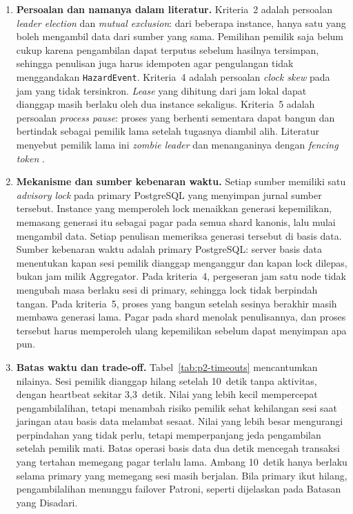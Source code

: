 \begin{enumerate}
\item \textbf{Persoalan dan namanya dalam literatur.} Kriteria~2 adalah persoalan \emph{leader election} dan \emph{mutual exclusion}: dari beberapa instance, hanya satu yang boleh mengambil data dari sumber yang sama. Pemilihan pemilik saja belum cukup karena pengambilan dapat terputus sebelum hasilnya tersimpan, sehingga penulisan juga harus idempoten agar pengulangan tidak menggandakan \texttt{HazardEvent}. Kriteria~4 adalah persoalan \emph{clock skew} pada jam yang tidak tersinkron. \emph{Lease} yang dihitung dari jam lokal dapat dianggap masih berlaku oleh dua instance sekaligus. Kriteria~5 adalah persoalan \emph{process pause}: proses yang berhenti sementara dapat bangun dan bertindak sebagai pemilik lama setelah tugasnya diambil alih. Literatur menyebut pemilik lama ini \emph{zombie leader} dan menanganinya dengan \emph{fencing token} \cite{kleppmann2017}.

\item \textbf{Mekanisme dan sumber kebenaran waktu.} Setiap sumber memiliki satu \emph{advisory lock} pada primary PostgreSQL yang menyimpan jurnal sumber tersebut. Instance yang memperoleh lock menaikkan generasi kepemilikan, memasang generasi itu sebagai pagar pada semua shard kanonis, lalu mulai mengambil data. Setiap penulisan memeriksa generasi tersebut di basis data. Sumber kebenaran waktu adalah primary PostgreSQL: server basis data menentukan kapan sesi pemilik dianggap menganggur dan kapan lock dilepas, bukan jam milik Aggregator. Pada kriteria~4, pergeseran jam satu node tidak mengubah masa berlaku sesi di primary, sehingga lock tidak berpindah tangan. Pada kriteria~5, proses yang bangun setelah sesinya berakhir masih membawa generasi lama. Pagar pada shard menolak penulisannya, dan proses tersebut harus memperoleh ulang kepemilikan sebelum dapat menyimpan apa pun.

\item \textbf{Batas waktu dan trade-off.} Tabel~\ref{tab:p2-timeouts} mencantumkan nilainya. Sesi pemilik dianggap hilang setelah 10~detik tanpa aktivitas, dengan heartbeat sekitar 3{,}3~detik. Nilai yang lebih kecil mempercepat pengambilalihan, tetapi menambah risiko pemilik sehat kehilangan sesi saat jaringan atau basis data melambat sesaat. Nilai yang lebih besar mengurangi perpindahan yang tidak perlu, tetapi memperpanjang jeda pengambilan setelah pemilik mati. Batas operasi basis data dua detik mencegah transaksi yang tertahan memegang pagar terlalu lama. Ambang 10~detik hanya berlaku selama primary yang memegang sesi masih berjalan. Bila primary ikut hilang, pengambilalihan menunggu failover Patroni, seperti dijelaskan pada Batasan yang Disadari.


\end{enumerate}
